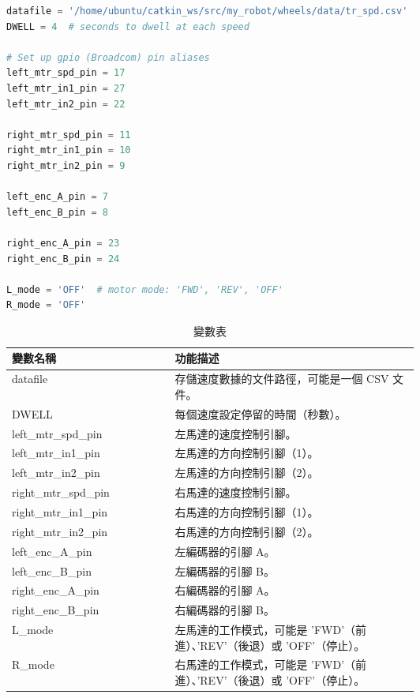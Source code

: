 \begin{lstlisting}[language=Python, caption=變數宣告]
datafile = '/home/ubuntu/catkin_ws/src/my_robot/wheels/data/tr_spd.csv'
DWELL = 4  # seconds to dwell at each speed

# Set up gpio (Broadcom) pin aliases
left_mtr_spd_pin = 17
left_mtr_in1_pin = 27
left_mtr_in2_pin = 22

right_mtr_spd_pin = 11
right_mtr_in1_pin = 10
right_mtr_in2_pin = 9

left_enc_A_pin = 7
left_enc_B_pin = 8

right_enc_A_pin = 23
right_enc_B_pin = 24

L_mode = 'OFF'  # motor mode: 'FWD', 'REV', 'OFF'
R_mode = 'OFF'
\end{lstlisting}
\begin{table}[ht]
\centering
\caption{變數表}
\label{tab:example9.2.1}
\begin{tabular}{|l|p{0.6\linewidth}|}
\hline
\textbf{變數名稱} & \textbf{功能描述} \\
\hline
datafile & 存儲速度數據的文件路徑，可能是一個 CSV 文件。 \\
\hline
DWELL & 每個速度設定停留的時間（秒數）。 \\
\hline
left\_mtr\_spd\_pin & 左馬達的速度控制引腳。 \\
\hline
left\_mtr\_in1\_pin & 左馬達的方向控制引腳（1）。 \\
\hline
left\_mtr\_in2\_pin & 左馬達的方向控制引腳（2）。 \\
\hline
right\_mtr\_spd\_pin & 右馬達的速度控制引腳。 \\
\hline
right\_mtr\_in1\_pin & 右馬達的方向控制引腳（1）。 \\
\hline
right\_mtr\_in2\_pin & 右馬達的方向控制引腳（2）。 \\
\hline
left\_enc\_A\_pin & 左編碼器的引腳 A。 \\
\hline
left\_enc\_B\_pin & 左編碼器的引腳 B。 \\
\hline
right\_enc\_A\_pin & 右編碼器的引腳 A。 \\
\hline
right\_enc\_B\_pin & 右編碼器的引腳 B。 \\
\hline
L\_mode & 左馬達的工作模式，可能是 'FWD'（前進）、'REV'（後退）或 'OFF'（停止）。 \\
\hline
R\_mode & 右馬達的工作模式，可能是 'FWD'（前進）、'REV'（後退）或 'OFF'（停止）。 \\
\hline
\end{tabular}
\end{table}

